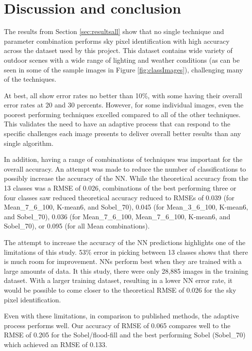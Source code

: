 \documentclass[final,3p,times,authoryear]{elsarticle}
\begin{document}
\section{Discussion and conclusion}\label{sec:conclusion}
The results from Section \ref{sec:resultsall} show that no single technique and parameter combination performs sky pixel identification with high accuracy across the dataset used by this project. This dataset contains wide variety of outdoor scenes with a wide range of lighting and weather conditions (as can be seen in some of the sample images in Figure \ref{fig:classImages}), challenging many of the techniques. 

At best, all show error rates no better than 10\%, with some having their overall error rates at 20 and 30 percents. However, for some individual images, even the poorest performing techniques excelled compared to all of the other techniques. This validates the need to have an adaptive process that can respond to the specific challenges each image presents to deliver overall better results than any single algorithm.


In addition, having a range of combinations of techniques was important for the overall accuracy. An attempt was made to reduce the number of classifications to possibly increase the accuracy of the NN. While the theoretical accuracy from the 13 classes was a RMSE of 0.026, combinations of the best performing three or four classes saw reduced theoretical accuracy reduced to RMSEs of 0.039 (for Mean\_7\_6\_100, K-mean6, and Sobel\_70), 0.045 (for Mean\_3\_6\_100, K-mean6, and Sobel\_70), 0.036 (for Mean\_7\_6\_100, Mean\_7\_6\_100, K-mean6, and Sobel\_70), or 0.095 (for all Mean combinations). 

The attempt to increase the accuracy of the NN predictions highlights one of the limitations of this study. 53\% error in picking between 13 classes shows that there is much room for improvement. NNs perform best when they are trained with a large amounts of data. It this study, there were only 28,885 images in the training dataset. With a larger training dataset, resulting in a lower NN error rate, it would be possible to come closer to the theoretical RMSE of 0.026 for the sky pixel identification.

Even with these limitations, in comparison to published methods, the adaptive process performs well. Our accuracy of RMSE of 0.065 compares well to the RMSE of 0.205 for the Sobel/flood-fill and the best performing Sobel (Sobel\_70) which achieved an RMSE of 0.133.
\end{document}
